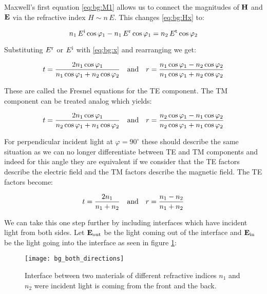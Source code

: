 Maxwell's first equation \eqref{eq:bg:M1} allows us to connect the magnitudes of $\vb H$ and $\vb E$ via the refractive index $H \sim n \, E$. This changes \eqref{eq:bg:Hx} to:

\begin{equation}
    n_1 \, E^{\mathrm{i}} \cos \varphi_1 - n_1 \, E^{\mathrm{r}} \cos \varphi_1 =
    n_2 \, E^{\mathrm{t}} \cos \varphi_2
\end{equation}

Substituting $E^{\mathrm{r}}$ or $E^{\mathrm{i}}$ with \eqref{eq:bg:x} and rearranging we get:

\begin{equation}
    t = \frac{2 n_1 \cos \varphi_1}{n_1 \cos \varphi_1 + n_2 \cos \varphi_2}
    \qq{and}
    r = \frac{n_1 \cos \varphi_1 - n_2 \cos \varphi_2}{
    n_1 \cos \varphi_1 + n_2 \cos \varphi_2}
\end{equation}

These are called the Fresnel equations for the TE component. The TM component can be treated analog which yields:

\begin{equation}
    t = \frac{2 n_1 \cos \varphi_1}{n_2 \cos \varphi_1 + n_1 \cos \varphi_2}
    \qq{and}
    r = \frac{n_2 \cos \varphi_1 - n_1 \cos \varphi_2}{
    n_2 \cos \varphi_1 + n_1 \cos \varphi_2}
\end{equation}

For perpendicular incident light at $\varphi = 90^\circ$ these should describe the same situation as we can no longer differentiate between TE and TM components and indeed for this angle they are equivalent if we consider that the TE factors describe the electric field and the TM factors describe the magnetic field. The TE factors become:

\begin{equation}
    t = \frac{2 n_1}{n_1 + n_2} \qq{and} r = \frac{n_1 - n_2}{n_1 + n_2}
\end{equation}

We can take this one step further by including interfaces which have incident light from both sides. Let $\vb E_{\mathrm{out}}$ be the light coming out of the interface and $\vb E_{\mathrm{in}}$ be the light going into the interface as seen in figure \ref{fig:bg:both}:

\begin{figure}[H]
    \centering
    \texttt{[image: bg\_both\_directions]}
    \caption{Interface between two materials of different refractive indices $n_1$ and $n_2$ were incident light is coming from the front and the back.}
    \label{fig:bg:both}
\end{figure}

